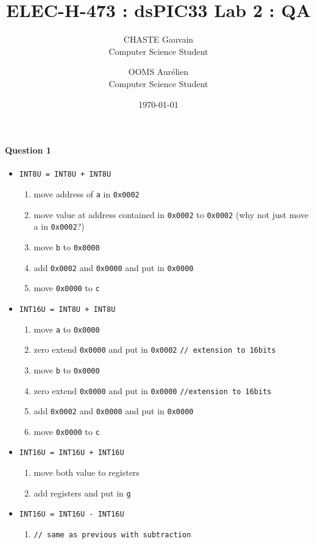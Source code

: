 \documentclass[10pt]{article}
\title{ELEC-H-473 : dsPIC33 Lab 2 : QA}
\author{CHASTE Gauvain  \\
	Computer Science Student \\
	\and 
	OOMS Aurélien \\
	Computer Science Student \\
}
\date{\today}
\begin{document}
\maketitle


\paragraph{Question 1}
\begin{multicols}{2}
\begin{itemize}
\item \verb!INT8U = INT8U + INT8U!
	\begin{enumerate}
	\item move address of \verb!a! in \verb!0x0002!
	\item move value at address contained in \verb!0x0002! to \verb!0x0002! (why not just move a in \verb!0x0002!?)
	\item move \verb!b! to \verb!0x0000!
	\item add \verb!0x0002! and \verb!0x0000! and put in \verb!0x0000!
	\item move \verb!0x0000! to \verb!c!
	\end{enumerate}

\item \verb!INT16U = INT8U + INT8U!
	\begin{enumerate}
	\item move \verb!a! to \verb!0x0000!
	\item zero extend \verb!0x0000! and put in \verb!0x0002! \verb!// extension to 16bits!
	\item move \verb!b! to \verb!0x0000!
	\item zero extend \verb!0x0000! and put in \verb!0x0000! \verb!//extension to 16bits!
	\item add \verb!0x0002! and \verb!0x0000! and put in \verb!0x0000!
	\item move \verb!0x0000! to \verb!c!
	\end{enumerate}

\item \verb!INT16U = INT16U + INT16U!
	\begin{enumerate}
	\item move both value to registers
	\item add registers and put in \verb!g!
	\end{enumerate}

\item \verb!INT16U = INT16U - INT16U!
	\begin{enumerate}
	\item \verb!// same as previous with subtraction!
	\end{enumerate}

\end{itemize}
\end{multicols}
\end{document}
